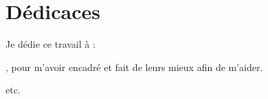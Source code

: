 \chapter*{\Huge Dédicaces}

\begingroup
    \large \raggedright Je dédie ce travail à :
    \vspace{4mm}
    
     \textbf{\@proFramerName}, \textbf{\@academicFramerName} pour m'avoir encadré et fait de leurs mieux afin de m'aider.
    
    \vspace{4mm}
    etc.
\endgroup

\vspace{8mm}
\begin{flushright}
    \LARGE {\@author}
\end{flushright}